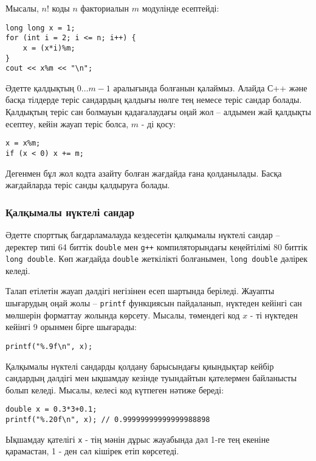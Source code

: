Мысалы, $n!$ коды $n$ факториалын $m$ модулінде есептейді:
\begin{lstlisting}
long long x = 1;
for (int i = 2; i <= n; i++) {
    x = (x*i)%m;
}
cout << x%m << "\n";
\end{lstlisting}

Әдетте қалдықтың $0\ldots m-1$ аралығында
болғанын қалаймыз.
Алайда С++ және басқа тілдерде теріс сандардың 
қалдығы нөлге тең немесе теріс сандар болады.
Қалдықтың теріс сан болмауын қадағалаудағы оңай жол –
алдымен жай қалдықты есептеу, кейін жауап теріс болса,
$m$ - ді қосу:
\begin{lstlisting}
x = x%m;
if (x < 0) x += m;
\end{lstlisting}
Дегенмен бұл жол кодта азайту болған жағдайда ғана қолданылады.
Басқа жағдайларда теріс санды қалдыруға болады.

\subsubsection{Қалқымалы нүктелі сандар}


Әдетте спорттық бағдарламалауда кездесетін қалқымалы
нүктелі сандар -- деректер типі 64 биттік \texttt{double}
мен \texttt{g++} компиляторындағы кеңейтілімі
80 биттік \texttt{long double}.
Көп жағдайда \texttt{double} жеткілікті болғанымен, \texttt{long double} дәлірек келеді.

Талап етілетін жауап дәлдігі негізінен есеп шартында беріледі.
Жауапты шығарудың оңай жолы –  \texttt{printf} функциясын пайдаланып,
нүктеден кейінгі сан мөлшерін форматтау жолында көрсету.
Мысалы, төмендегі код $x$ - ті нүктеден кейінгі 9 орынмен бірге шығарады:

\begin{lstlisting}
printf("%.9f\n", x);
\end{lstlisting}

Қалқымалы нүктелі сандарды қолдану барысындағы қиындықтар
кейбір сандардың дәлдігі мен ықшамдау кезінде туындайтын қателермен байланысты болып келеді.
Мысалы, келесі код күтпеген нәтиже береді:

\begin{lstlisting}
double x = 0.3*3+0.1;
printf("%.20f\n", x); // 0.99999999999999988898
\end{lstlisting}

Ықшамдау қателігі \texttt{x} - тің мәнін дұрыс жауабында дәл 1-ге тең екеніне қарамастан, 1 - ден сәл кішірек етіп көрсетеді.


